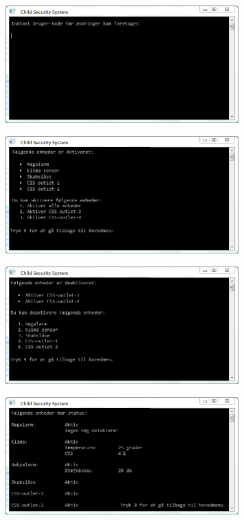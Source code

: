 \begin{figure}[h] \centering
{\includegraphics[width=0.8\textwidth]{billeder/cmdprompt/CSS_login}}
\caption{}
\label{fig:CSS Login}
\end{figure}

\begin{figure}[h] \centering
{\includegraphics[width=0.8\textwidth]{billeder/cmdprompt/CSS_aktiver}}
\caption{}
\label{fig:CSS Aktiver}
\end{figure}

\begin{figure}[h] \centering
{\includegraphics[width=0.8\textwidth]{billeder/cmdprompt/CSS_deaktiver}}
\caption{}
\label{fig:CSS Deaktvier}
\end{figure}

\begin{figure}[h] \centering
{\includegraphics[width=0.8\textwidth]{billeder/cmdprompt/CSS_vis_status}}
\caption{}
\label{fig:CSS Vis Status}
\end{figure}

